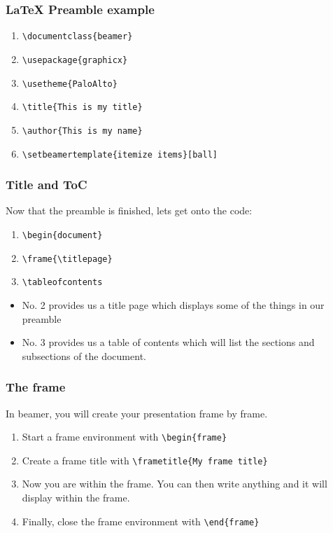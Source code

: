 \documentclass[nogin]{beamer}\usepackage[]{graphicx}\usepackage[]{color}
\begin{document}
\begin{frame}[fragile]
\frametitle{LaTeX Preamble example}
\begin{enumerate}
\item \verb|\documentclass{beamer}|
\item \verb|\usepackage{graphicx}|
\item \verb|\usetheme{PaloAlto}|
\item \verb|\title{This is my title}|
\item \verb|\author{This is my name}|
\item \verb|\setbeamertemplate{itemize items}[ball]|
\end{enumerate}
\end{frame}

\begin{frame}[fragile]
\frametitle{Title and ToC}
Now that the preamble is finished, lets get onto the code:
\begin{enumerate}
\item \verb|\begin{document}|
\item \verb|\frame{\titlepage}|
\item \verb|\tableofcontents|
\end{enumerate}
\begin{itemize}
\item No. 2 provides us a title page which displays some of the things in our preamble
\item No. 3 provides us a table of contents which will list the sections and subsections of the document.
\end{itemize}
\end{frame}

\begin{frame}[fragile]
\frametitle{The frame}
\footnotesize
In beamer, you will create your presentation frame by frame.
\begin{enumerate}
\item Start a frame environment with \verb|\begin{frame}|
\item Create a frame title with \verb|\frametitle{My frame title}|
\item Now you are within the frame. You can then write anything and it will display within the frame.
\item Finally, close the frame environment with \verb|\end{frame}|
\end{enumerate}
\end{frame}
\end{document}
